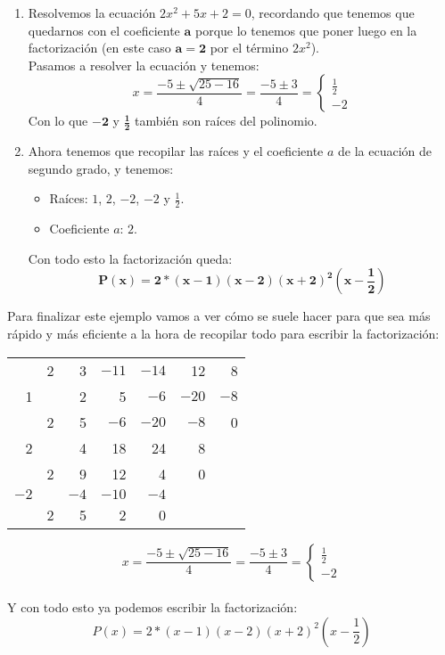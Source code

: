 \documentclass[a4paper,11pt,answers]{exam}
\begin{document}
\begin{solution}
\begin{enumerate}
  \item Resolvemos la ecuación $2x^2 + 5x + 2 = 0$, recordando que tenemos que quedarnos con el coeficiente $\boldsymbol{a}$ porque lo tenemos que poner luego en la factorización (en este caso $\boldsymbol{a=2}$ por el término $2x^2$).\\
    Pasamos a resolver la ecuación y tenemos:
    \[x = \frac{-5\pm \sqrt{25-16}}{4} = \frac{-5\pm 3}{4} =
      \begin{cases}\frac{1}{2}\\-2\end{cases}\]
    Con lo que $\boldsymbol{-2}$ y $\boldsymbol{\frac{1}{2}}$ también son raíces del polinomio.
  \item Ahora tenemos que recopilar las raíces y el coeficiente $a$ de la ecuación de segundo grado, y tenemos:
    \begin{itemize}
    \item Raíces: $1$, $2$, $-2$, $-2$ y $\frac{1}{2}$.
    \item Coeficiente $a$: $2$.
    \end{itemize}
    Con todo esto la factorización queda:
    \[\boldsymbol{P(x) = 2*(x-1)(x-2)(x+2)^2\left(x-\frac{1}{2}\right)}\]
  \end{enumerate}

  Para finalizar este ejemplo vamos a ver cómo se suele hacer para que sea más rápido y más eficiente a la hora de recopilar todo para escribir la factorización:
  \begin{small}
  \begin{center}
    \begin{tabular}{r|rrrrrr}
      &2&3&$-11$&$-14$&12&8\\
      1&&2&5&$-6$&$-20$&$-8$\\
      \hline
      &2&5&$-6$&$-20$&$-8$&0\\
      2&&4&18&24&8&\\
        \hline
        &2&9&12&4&0&\\
      $-2$&&$-4$&$-10$&$-4$&&\\
        \hline
        &2&5&2&0&&
    \end{tabular}
  \end{center}
  \end{small}
  \[x = \frac{-5\pm \sqrt{25-16}}{4} = \frac{-5\pm 3}{4} =
    \begin{cases}\frac{1}{2}\\-2\end{cases}\]\\
\vspace*{1cm}Y con todo esto ya podemos escribir la factorización:
  \[P(x) = 2*(x-1)(x-2)(x+2)^2\left(x-\frac{1}{2}\right)\]
\end{solution}
\end{document}
